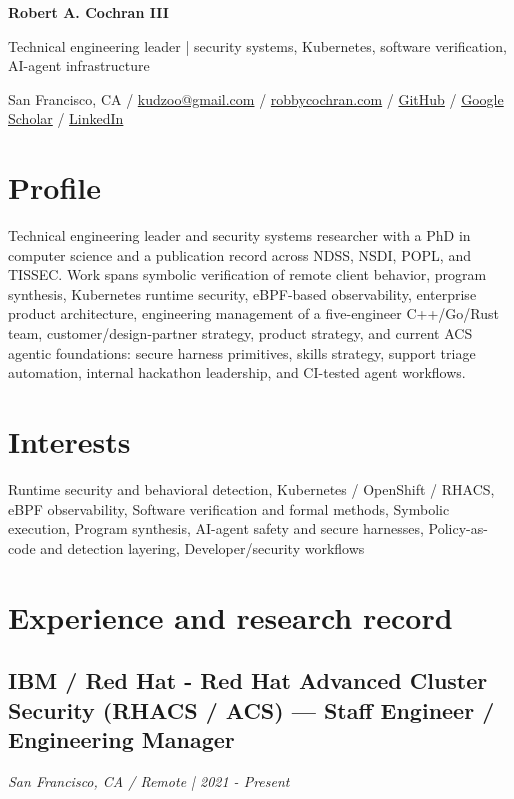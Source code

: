 \documentclass[10pt,letterpaper]{article}
\newcommand{\cvtitle}[1]{{\Huge\bfseries #1}\vspace{3pt}}
\begin{document}
\cvtitle{Robert A. Cochran III}

Technical engineering leader | security systems, Kubernetes, software verification, AI-agent infrastructure

San Francisco, CA / \href{mailto:kudzoo@gmail.com}{kudzoo@gmail.com} / \href{https://www.robbycochran.com/}{robbycochran.com} / \href{https://github.com/robbycochran}{GitHub} / \href{https://scholar.google.com/citations?user=qW0wkZIAAAAJ\&hl=en}{Google Scholar} / \href{https://www.linkedin.com/in/robertacochran}{LinkedIn}

\section*{Profile}

Technical engineering leader and security systems researcher with a PhD in computer science and a publication record across NDSS, NSDI, POPL, and TISSEC. Work spans symbolic verification of remote client behavior, program synthesis, Kubernetes runtime security, eBPF-based observability, enterprise product architecture, engineering management of a five-engineer C++/Go/Rust team, customer/design-partner strategy, product strategy, and current ACS agentic foundations: secure harness primitives, skills strategy, support triage automation, internal hackathon leadership, and CI-tested agent workflows.

\section*{Interests}

Runtime security and behavioral detection, Kubernetes / OpenShift / RHACS, eBPF observability, Software verification and formal methods, Symbolic execution, Program synthesis, AI-agent safety and secure harnesses, Policy-as-code and detection layering, Developer/security workflows

\section*{Experience and research record}

\subsection*{IBM / Red Hat - Red Hat Advanced Cluster Security (RHACS / ACS) — Staff Engineer / Engineering Manager}

\emph{San Francisco, CA / Remote | 2021 - Present}
\end{document}
